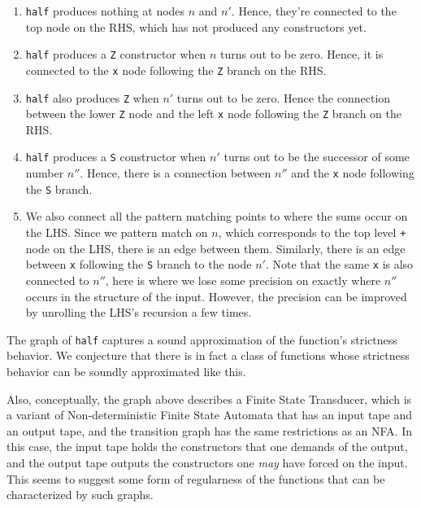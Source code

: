 \documentclass{article}
\begin{document}
\begin{enumerate}
  \item \verb|half| produces nothing at nodes $n$ and $n'$. Hence,
    they're connected to the top node on the RHS, which has not
    produced any constructors yet.

  \item \verb|half| produces a \verb|Z| constructor when $n$ turns out
    to be zero. Hence, it is connected to the \verb|x| node following
    the \verb|Z| branch on the RHS.

  \item \verb|half| also produces \verb|Z| when $n'$ turns out to be
    zero. Hence the connection between the lower \verb|Z| node and the
    left \verb|x| node following the \verb|Z| branch on the RHS.

  \item \verb|half| produces a \verb|S| constructor when $n'$ turns
    out to be the successor of some number $n''$. Hence, there is a
    connection between $n''$ and the \verb|x| node following the
    \verb|S| branch.

  \item We also connect all the pattern matching points to where the
    sums occur on the LHS. Since we pattern match on $n$, which
    corresponds to the top level \verb|+| node on the LHS, there is an
    edge between them. Similarly, there is an edge between \verb|x|
    following the \verb|S| branch to the node $n'$. Note that the same
    \verb|x| is also connected to $n''$, here is where we lose some
    precision on exactly where $n''$ occurs in the structure of the
    input. However, the precision can be improved by unrolling the
    LHS's recursion a few times.
\end{enumerate}

The graph of \verb|half| captures a sound approximation of the
function's strictness behavior. We conjecture that there is in fact a
class of functions whose strictness behavior can be soundly
approximated like this.

Also, conceptually, the graph above describes a Finite State
Transducer, which is a variant of Non-deterministic Finite State
Automata that has an input tape and an output tape, and the transition
graph has the same restrictions as an NFA. In this case, the input
tape holds the constructors that one demands of the output, and the
output tape outputs the constructors one \textit{may} have forced on
the input. This seems to suggest some form of regularness of the
functions that can be characterized by such graphs.
\end{document}
